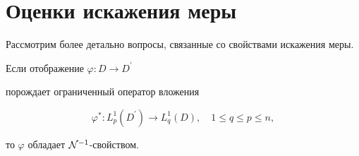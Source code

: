 







\section{Оценки искажения меры}





Рассмотрим более детально вопросы, связанные со свойствами искажения меры.





\begin{thm}


Если отображение $\varphi:D\to D^{\prime}$


порождает ограниченный оператор вложения


$$


\varphi^{\ast} :


L^1_p(D^{\prime})\to L^1_q(D),\quad 1\leq q\leq p\leq n,


$$


то $\varphi$ обладает ${\cal N}^{-1}$-свойством.


\end{thm}





